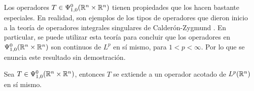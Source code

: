 \begin{remark}
	Los operadores $T\in\Psi^0_{1, 0}(\mathbb{R}^n\times\mathbb{R}^n)$ tienen propiedades que los hacen bastante especiales. En realidad, son ejemplos de los tipos de operadores que dieron inicio a la teoría de operadores integrales singulares de Calderón-Zygmund \cite{calderon-zygmund}. En particular, se puede utilizar esta teoría para concluir que los operadores en $\Psi^0_{1, 0}(\mathbb{R}^n\times\mathbb{R}^n)$ son continuos de $L^p$ en sí mismo, para $1<p<\infty$. Por lo que se enuncia este resultado sin demostración.
\end{remark}
\begin{theorem}\label{theo:Lp-boundedness-S0}
	Sea $T\in\Psi^0_{1, 0}(\mathbb{R}^n\times\mathbb{R}^n)$, entonces $T$ se extiende a un operador acotado de $L^p(\mathbb{R}^n)$ en sí mismo.
\end{theorem}


